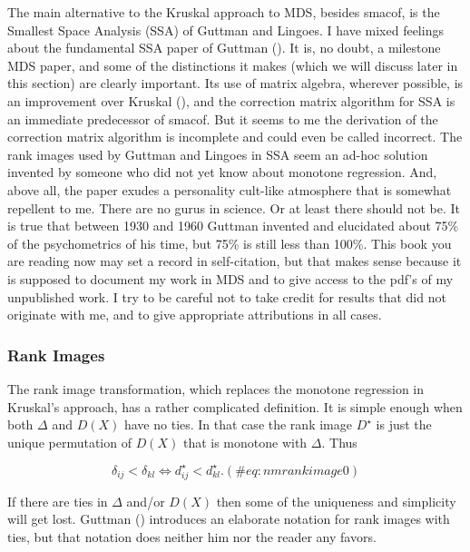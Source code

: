 \documentclass[
  12pt,
  letterpaper,
  DIV=11,
  numbers=noendperiod]{scrreprt}
\theoremstyle{remark}
\begin{document}
The main alternative to the Kruskal approach to MDS, besides smacof, is
the Smallest Space Analysis (SSA) of Guttman and Lingoes. I have mixed
feelings about the fundamental SSA paper of Guttman
(). It is, no doubt, a milestone MDS
paper, and some of the distinctions it makes (which we will discuss
later in this section) are clearly important. Its use of matrix algebra,
wherever possible, is an improvement over Kruskal
(), and the correction matrix algorithm
for SSA is an immediate predecessor of smacof. But it seems to me the
derivation of the correction matrix algorithm is incomplete and could
even be called incorrect. The rank images used by Guttman and Lingoes in
SSA seem an ad-hoc solution invented by someone who did not yet know
about monotone regression. And, above all, the paper exudes a
personality cult-like atmosphere that is somewhat repellent to me. There
are no gurus in science. Or at least there should not be. It is true
that between 1930 and 1960 Guttman invented and elucidated about 75\% of
the psychometrics of his time, but 75\% is still less than 100\%. This
book you are reading now may set a record in self-citation, but that
makes sense because it is supposed to document my work in MDS and to
give access to the pdf's of my unpublished work. I try to be careful not
to take credit for results that did not originate with me, and to give
appropriate attributions in all cases.

\subsubsection{Rank Images}\label{rank-images}

The rank image transformation, which replaces the monotone regression in
Kruskal's approach, has a rather complicated definition. It is simple
enough when both \(\Delta\) and \(D(X)\) have no ties. In that case the
rank image \(D^\star\) is just the unique permutation of \(D(X)\) that
is monotone with \(\Delta\). Thus

\begin{equation}
\delta_{ij}<\delta_{kl}\Leftrightarrow d_{ij}^\star<d_{kl}^\star.
(\#eq:nmrankimage0)
\end{equation}

If there are ties in \(\Delta\) and/or \(D(X)\) then some of the
uniqueness and simplicity will get lost. Guttman
() introduces an elaborate notation for
rank images with ties, but that notation does neither him nor the reader
any favors.
\end{document}
